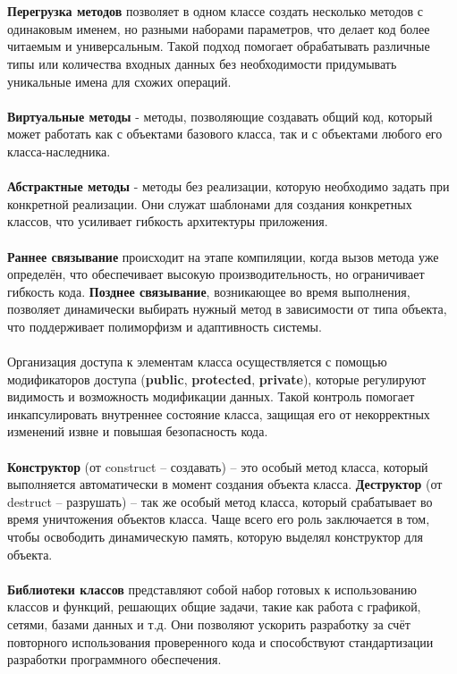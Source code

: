 \documentclass[a4paper, 12pt]{report}
\numberwithin{equation}{section}
\begin{document}
	\\\\
	\textbf{Перегрузка методов} позволяет в одном классе создать несколько методов с одинаковым именем, но разными наборами параметров, что делает код более читаемым и универсальным. Такой подход помогает обрабатывать различные типы или количества входных данных без необходимости придумывать уникальные имена для схожих операций.
	\\\\
	\textbf{Виртуальные методы} - методы, позволяющие создавать общий код, который может работать как с объектами базового класса, так и с
	объектами любого его класса-наследника.
	\\\\
	\textbf{Абстрактные методы} - методы без реализации, которую необходимо задать при конкретной реализации. Они служат шаблонами для создания конкретных классов, что усиливает гибкость архитектуры приложения.
	\\\\
	\textbf{Раннее связывание} происходит на этапе компиляции, когда вызов метода уже определён, что обеспечивает высокую производительность, но ограничивает гибкость кода. \textbf{Позднее связывание}, возникающее во время выполнения, позволяет динамически выбирать нужный метод в зависимости от типа объекта, что поддерживает полиморфизм и адаптивность системы.
	\\\\
	Организация доступа к элементам класса осуществляется с помощью модификаторов доступа (\textbf{public}, \textbf{protected}, \textbf{private}), которые регулируют видимость и возможность модификации данных. Такой контроль помогает инкапсулировать внутреннее состояние класса, защищая его от некорректных изменений извне и повышая безопасность кода.
	\\\\
	\textbf{Конструктор} (от construct – создавать) – это особый метод класса, который выполняется автоматически в момент создания объекта класса. 
	\textbf{Деструктор} (от destruct – разрушать) – так же особый метод класса, который срабатывает во время уничтожения объектов класса. Чаще всего его роль заключается в том, чтобы освободить динамическую память, которую выделял конструктор для объекта.
	\\\\
	\textbf{Библиотеки классов} представляют собой набор готовых к использованию классов и функций, решающих общие задачи, такие как работа с графикой, сетями, базами данных и т.д. Они позволяют ускорить разработку за счёт повторного использования проверенного кода и способствуют стандартизации разработки программного обеспечения.
\end{document}

